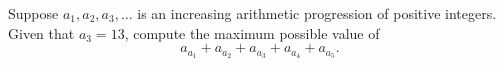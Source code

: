 Suppose $a_1, a_2, a_3, \dots$ is an increasing arithmetic progression of positive integers.  Given that $a_3 = 13$, compute the maximum possible value of \[ a_{a_1} + a_{a_2} + a_{a_3} + a_{a_4} + a_{a_5}. \]
